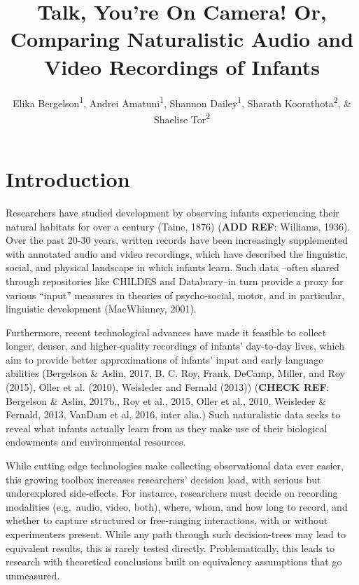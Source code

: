 \documentclass[man]{apa6}
\title{Talk, You're On Camera! Or, Comparing Naturalistic Audio and Video
Recordings of Infants}
\author{Elika Bergelson\textsuperscript{1}, Andrei Amatuni\textsuperscript{1}, Shannon Dailey\textsuperscript{1}, Sharath Koorathota\textsuperscript{2}, \& Shaelise Tor\textsuperscript{2}}
\affiliation{
    \vspace{0.5cm}
          \textsuperscript{1} Duke University\\
          \textsuperscript{2} University of Rochester  }
\theoremstyle{definition}
\theoremstyle{definition}
\theoremstyle{definition}
\theoremstyle{remark}
\begin{document}
\maketitle

\setcounter{secnumdepth}{0}



\section{Introduction}\label{introduction}

Researchers have studied development by observing infants experiencing
their natural habitats for over a century (Taine, 1876) (\textbf{ADD
REF}: Williams, 1936). Over the past 20-30 years, written records have
been increasingly supplemented with annotated audio and video
recordings, which have described the linguistic, social, and physical
landscape in which infants learn. Such data --often shared through
repositories like CHILDES and Databrary--in turn provide a proxy for
various \enquote{input} measures in theories of psycho-social, motor,
and in particular, linguistic development (MacWhinney, 2001).

Furthermore, recent technological advances have made it feasible to
collect longer, denser, and higher-quality recordings of infants'
day-to-day lives, which aim to provide better approximations of infants'
input and early language abilities (Bergelson \& Aslin, 2017, B. C. Roy,
Frank, DeCamp, Miller, and Roy (2015), Oller et al. (2010), Weisleder
and Fernald (2013)) (\textbf{CHECK REF}: Bergelson \& Aslin, 2017b,, Roy
et al., 2015, Oller et al., 2010, Weisleder \& Fernald, 2013, VanDam et
al, 2016, inter alia.) Such naturalistic data seeks to reveal what
infants actually learn from as they make use of their biological
endowments and environmental resources.

While cutting edge technologies make collecting observational data ever
easier, this growing toolbox increases researchers' decision load, with
serious but underexplored side-effects. For instance, researchers must
decide on recording modalities (e.g.~audio, video, both), where, whom,
and how long to record, and whether to capture structured or
free-ranging interactions, with or without experimenters present. While
any path through such decision-trees may lead to equivalent results,
this is rarely tested directly. Problematically, this leads to research
with theoretical conclusions built on equivalency assumptions that go
unmeasured.
\end{document}
